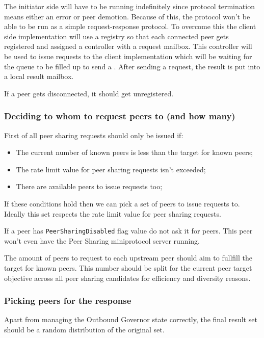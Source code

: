 The initiator side will have to be running indefinitely since protocol termination means
either an error or peer demotion. Because of this, the protocol won't be able to be run as
a simple request-response protocol. To overcome this the client side implementation will
use a registry so that each connected peer gets registered and assigned a controller with
a request mailbox. This controller will be used to issue requests to the client
implementation which will be waiting for the queue to be filled up to send a
\MsgShareRequest. After sending a request, the result is put into a local result mailbox.

If a peer gets disconnected, it should get unregistered.

\subsubsection{Deciding to whom to request peers to (and how many)}

First of all peer sharing requests should only be issued if:

\begin{itemize}
  \item The current number of known peers is less than the target for known peers;
  \item The rate limit value for peer sharing requests isn't exceeded;
  \item There are available peers to issue requests too;
\end{itemize}

If these conditions hold then we can pick a set of peers to issue requests to.
Ideally this set respects the rate limit value for peer sharing requests.

If a peer has \texttt{PeerSharingDisabled} flag value do not ask it for peers.
This peer won't even have the Peer Sharing miniprotocol server running.

The amount of peers to request to each upstream peer should aim to fullfill
the target for known peers. This number should be split for the current peer
target objective across all peer sharing candidates for efficiency and
diversity reasons.

\subsubsection{Picking peers for the response}

Apart from managing the Outbound Governor state correctly, the final result
set should be a random distribution of the original set.

